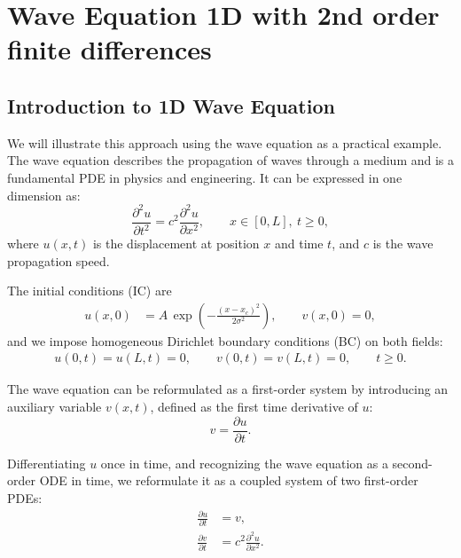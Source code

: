 \chapter{Wave Equation 1D with 2nd order finite differences}
\label{ch::chapter6}

\vspace{-1cm}

\section{Introduction to 1D Wave Equation}

We will illustrate this approach using the wave equation as a practical example. The wave equation describes the propagation of waves through a medium and is a fundamental PDE in physics and engineering. It can be expressed in one dimension as:
\begin{equation}
\frac{\partial^2 u}{\partial t^2} = c^2 \frac{\partial^2 u}{\partial x^2}, 
\qquad x\in[0,L],\ t\ge 0,
\label{eq:wave_equation}
\end{equation}
where $u(x,t)$ is the displacement at position $x$ and time $t$, and $c$ is the wave propagation speed.

The initial conditions (IC) are
\begin{align}
u(x,0) &= A\,\exp\!\left(-\frac{(x-x_c)^2}{2\sigma^2}\right), \qquad v(x,0) = 0,
\label{eq:initial_conditions}
\end{align}
and we impose homogeneous Dirichlet boundary conditions (BC) on both fields:
\begin{align}
u(0,t) = u(L,t) = 0, \qquad
v(0,t) = v(L,t) = 0, \qquad t\ge 0.
\label{eq:boundary_conditions}
\end{align}

The wave equation can be reformulated as a first-order system by introducing an auxiliary variable $v(x,t)$, defined as the first time derivative of $u$:
\begin{equation}
v = \frac{\partial u}{\partial t}.
\label{eq:auxiliary_variable}
\end{equation}

Differentiating $u$ once in time, and recognizing the wave equation as a second-order ODE in time, we reformulate it as a coupled system of two first-order PDEs:
\begin{equation}
\begin{aligned}
\frac{\partial u}{\partial t} &= v, \\
\frac{\partial v}{\partial t} &= c^2 \frac{\partial^2 u}{\partial x^2}.
\end{aligned}
\label{eq:coupled_system}
\end{equation}

